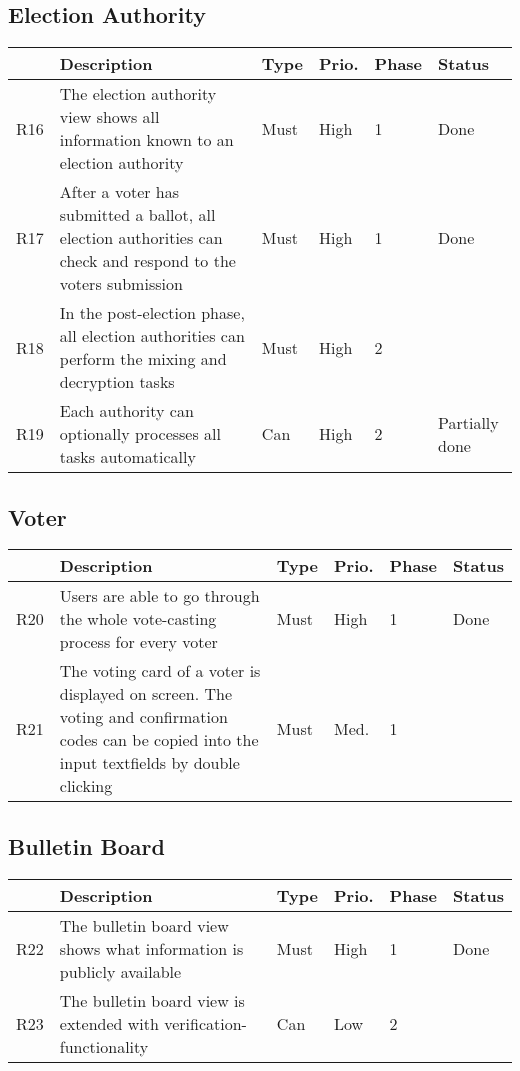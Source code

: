 \subsection{Election Authority}
\begin{longtable}{p{0.5cm}p{9cm}p{1cm}p{1cm}p{1cm}p{1cm}}
\hline
 & Description & Type & Prio. & Phase & Status\\
\hline
R16 & The election authority view shows all information known to an election authority & Must & High & 1 & Done\\
R17 & After a voter has submitted a ballot, all election authorities can check and respond to the voters submission & Must & High & 1 & Done\\
R18 & In the post-election phase, all election authorities can perform the mixing and decryption tasks & Must & High & 2 & \\
R19 & Each authority can optionally processes all tasks automatically & Can & High & 2 & Partially done\\
\end{longtable}


\subsection{Voter}
\begin{longtable}{p{0.5cm}p{9cm}p{1cm}p{1cm}p{1cm}p{1cm}}
\hline
 & Description & Type & Prio. & Phase & Status\\
\hline
R20 & Users are able to go through the whole vote-casting process for every voter & Must & High & 1 & Done\\
R21 & The voting card of a voter is displayed on screen. The voting and confirmation codes can be copied into the input textfields by double clicking & Must & Med. & 1 & \\
\end{longtable}


\subsection{Bulletin Board}
\begin{longtable}{p{0.5cm}p{9cm}p{1cm}p{1cm}p{1cm}p{1cm}}
\hline
 & Description & Type & Prio. & Phase & Status\\
\hline
R22 & The bulletin board view shows what information is publicly available & Must & High & 1 & Done\\
R23 & The bulletin board view is extended with verification-functionality & Can & Low & 2 & \\
\end{longtable}


